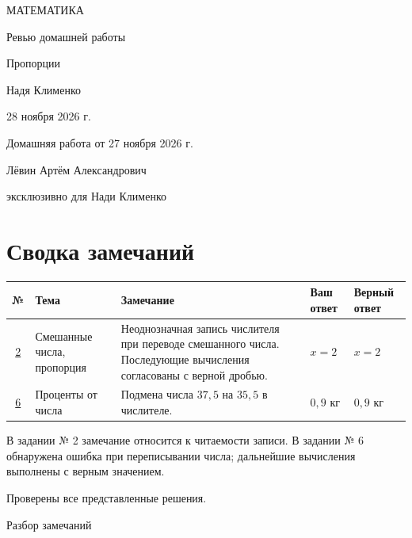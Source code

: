 \documentclass[a4paper,11pt]{article}
\begin{document}
\begin{titlepage}
\centering
\vspace*{25mm}
{\Large\color{darkaccent} МАТЕМАТИКА\par}
\vspace{17mm}
{\LARGE Ревью домашней работы\par}
\vspace{12mm}
{\Large\color{accent} Пропорции\par}
\vfill
{\large Надя Клименко\par}
\vspace{8mm}
28 ноября 2026 г.\par
{\small Домашняя работа от 27 ноября 2026 г.\par}
\vfill
{\small Лёвин Артём Александрович\par эксклюзивно для Нади Клименко\par}
\vspace{10mm}
\end{titlepage}
\section*{Сводка замечаний}
\begin{tabularx}{\linewidth}{@{}c p{.20\linewidth} X p{.14\linewidth} p{.14\linewidth}@{}}
\toprule
№ & Тема & Замечание & Ваш ответ & Верный ответ\\
\midrule
\hyperref[task:2]{2} & Смешанные числа, пропорция & Неоднозначная запись числителя при переводе смешанного числа. Последующие вычисления согласованы с верной дробью. & $x=2$ & $x=2$\\
\midrule
\hyperref[task:6]{6} & Проценты от числа & Подмена числа $37{,}5$ на $35{,}5$ в числителе. & $0{,}9$ кг & $0{,}9$ кг\\
\bottomrule
\end{tabularx}
\medskip
В задании № 2 замечание относится к читаемости записи. В задании № 6 обнаружена ошибка при переписывании числа; дальнейшие вычисления выполнены с верным значением.
\par
Проверены все представленные решения.
\clearpage
\thispagestyle{empty}
\vspace*{\fill}
\begin{center}
{\LARGE\color{darkaccent} Разбор замечаний}
\end{center}
\vspace*{\fill}
\clearpage
{}\label{task:2}
\end{document}
